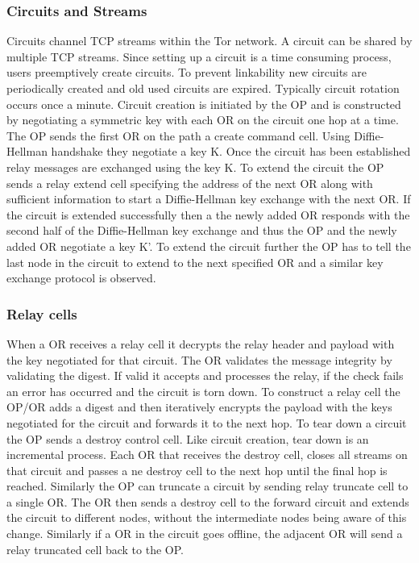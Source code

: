 \documentclass{llncs}
\begin{document}
\subsubsection{Circuits and Streams}
Circuits channel TCP streams within the Tor network. A circuit can be shared by multiple TCP streams. Since setting up a circuit is a time consuming process, users preemptively create circuits. To prevent linkability new circuits are periodically created and old used circuits are expired. Typically circuit rotation occurs once a minute. Circuit creation is initiated by the OP and is constructed by negotiating a symmetric key with each OR on the circuit one hop at a time. The OP sends the first OR on the path a create command cell. Using Diffie-Hellman handshake they negotiate a key K. Once the circuit has been established relay messages are exchanged using the key K. To extend the circuit the OP sends a relay extend cell specifying the address of the next OR along with sufficient information to start a Diffie-Hellman key exchange with the next OR. If the circuit is extended successfully then a the newly added OR responds with the second half of the Diffie-Hellman key exchange and thus the OP and the newly added OR negotiate a key K'. To extend the circuit further the OP has to tell the last node in the circuit to extend to the next specified OR and a similar key exchange protocol is observed.

\subsubsection{Relay cells}
When a OR receives a relay cell it decrypts the relay header and payload with the key negotiated for that circuit. The OR validates the message integrity by validating the digest. If valid it accepts and processes the relay, if the check fails an error has occurred and the circuit is torn down.
To construct a relay cell the OP/OR adds a digest and then iteratively encrypts the payload with the keys negotiated for the circuit and forwards it to the next hop.
To tear down a circuit the OP sends a destroy control cell. Like circuit creation, tear down is an incremental process. Each OR that receives the destroy cell, closes all streams on that circuit and passes a ne destroy cell to the next hop until the final hop is reached.
Similarly the OP can truncate a circuit by sending relay truncate cell to a single OR. The OR then sends a destroy cell to the forward circuit and extends the circuit to different nodes, without the intermediate nodes being aware of this change. Similarly if a OR in the circuit goes offline, the adjacent OR will send a relay truncated cell back to the OP. 
\end{document}

